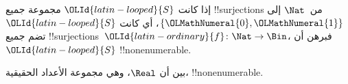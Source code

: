 \documentclass[../../../include/open-logic-section]{subfiles}
\begin{document}
\begin{prob}
إذا كانت ${\OLId{latin-looped}{S}}$ مجموعة جميع !!{surjection}s من~$\Nat$ إلى $\{{\OLMathNumeral{0}},{\OLMathNumeral{1}}\}$، أي كانت ${\OLId{latin-looped}{S}}$ تضم جميع !!{surjection}s~${\OLId{latin-ordinary}{f}} \colon \Nat
\to \Bin$، فبرهن أن ${\OLId{latin-looped}{S}}$ !!{nonenumerable}.
\end{prob}

\begin{prob}
بين أن $\Real$، وهي مجموعة الأعداد الحقيقية، !!{nonenumerable}.
\end{prob}
\end{document}
